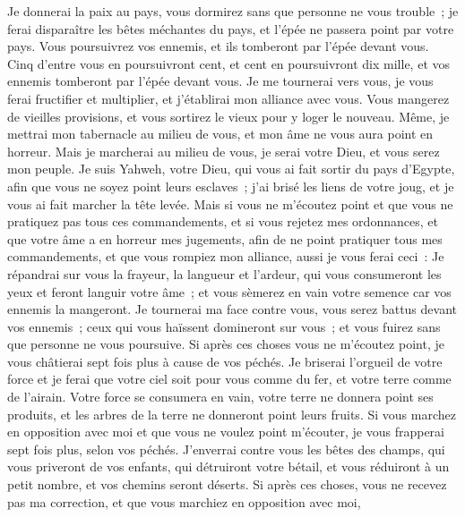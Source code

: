 \begin{multicols}{2}
Je donnerai la paix au pays, vous dormirez sans que personne ne vous trouble~; je ferai disparaître les bêtes méchantes du pays, et l'épée ne passera point par votre pays.
Vous poursuivrez vos ennemis, et ils tomberont par l'épée devant vous.
Cinq d'entre vous en poursuivront cent, et cent en poursuivront dix mille, et vos ennemis tomberont par l'épée devant vous.
Je me tournerai vers vous, je vous ferai fructifier et multiplier, et j'établirai mon alliance avec vous.
Vous mangerez de vieilles provisions, et vous sortirez le vieux pour y loger le nouveau.
Même, je mettrai mon tabernacle au milieu de vous, et mon âme ne vous aura point en horreur.
Mais je marcherai au milieu de vous, je serai votre Dieu, et vous serez mon peuple.
Je suis Yahweh, votre Dieu, qui vous ai fait sortir du pays d'Egypte, afin que vous ne soyez point leurs esclaves~; j'ai brisé les liens de votre joug, et je vous ai fait marcher la tête levée.
Mais si vous ne m'écoutez point et que vous ne pratiquez pas tous ces commandements,
et si vous rejetez mes ordonnances, et que votre âme a en horreur mes jugements, afin de ne point pratiquer tous mes commandements, et que vous rompiez mon alliance,
aussi je vous ferai ceci~: Je répandrai sur vous la frayeur, la langueur et l'ardeur, qui vous consumeront les yeux et feront languir votre âme~; et vous sèmerez en vain votre semence car vos ennemis la mangeront.
Je tournerai ma face contre vous, vous serez battus devant vos ennemis~; ceux qui vous haïssent domineront sur vous~; et vous fuirez sans que personne ne vous poursuive.
Si après ces choses vous ne m'écoutez point, je vous châtierai sept fois plus à cause de vos péchés.
Je briserai l'orgueil de votre force et je ferai que votre ciel soit pour vous comme du fer, et votre terre comme de l'airain.
Votre force se consumera en vain, votre terre ne donnera point ses produits, et les arbres de la terre ne donneront point leurs fruits.
Si vous marchez en opposition avec moi et que vous ne voulez point m'écouter, je vous frapperai sept fois plus, selon vos péchés.
J'enverrai contre vous les bêtes des champs, qui vous priveront de vos enfants, qui détruiront votre bétail, et vous réduiront à un petit nombre, et vos chemins seront déserts.
Si après ces choses, vous ne recevez pas ma correction, et que vous marchiez en opposition avec moi,

\end{multicols}

